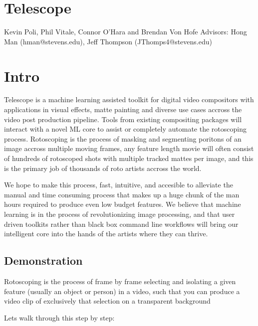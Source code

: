 \documentclass[15pt]{article}
\author{Kevin Poli}
\date{\today}
\title{}
\begin{document}
\tableofcontents

\section{Telescope}
\label{sec:orgb5dae43}
Kevin Poli, Phil Vitale, Connor O'Hara and Brendan Von Hofe
Advisors: Hong Man (hman@stevens.edu), Jeff Thompson (JThomps4@stevens.edu)
\section{Intro}
\label{sec:org3168d0f}
Telescope is a machine learning assisted toolkit for digital video compositors
with applications in visual effects, matte painting and diverse use cases
accross the video post production pipeline. Tools from existing compositing
packages will interact with a novel ML core to assist or completely automate the
rotoscoping process. Rotoscoping is the process of masking and segmenting
poritons of an image accross multiple moving frames, any feature length movie
will often consist of hundreds of rotoscoped shots with multiple tracked mattes
per image, and this is the primary job of thousands of roto artists accross the world.

We hope to make this process, fast, intuitive, and accesible to alleviate the
manual and time consuming process that makes up a huge chunk of the man hours
required to produce even low budget features. We believe that machine learning
is in the process of revolutionizing image processing, and that user driven
toolkits rather than black box command line workflows will bring our intelligent
core into the hands of the artists where they can thrive.
\subsection{Demonstration}
\label{sec:org18f8651}
Rotoscoping is the process of frame by frame selecting and isolating a given feature (usually
an object or person) in a video, such that you can produce a video clip of
exclusively that selection on a transparent background

Lets walk through this step by step:
\end{document}
